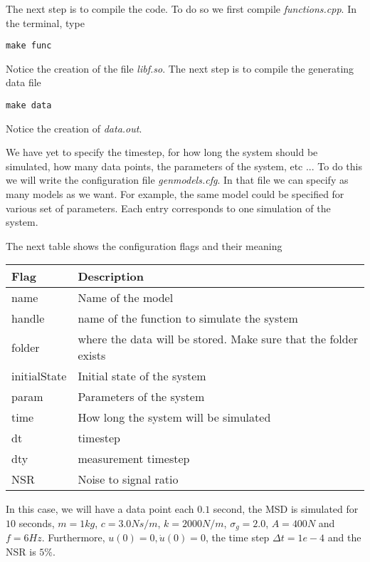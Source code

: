 \documentclass{article}
\begin{document}
% 

The next step is to compile the code. To do so we first compile {\em functions.cpp}. In the terminal, type
\begin{lstlisting}
make func
\end{lstlisting}
Notice the creation of the file {\em libf.so}. The next step is to compile the generating data file
\begin{lstlisting}
make data
\end{lstlisting}
Notice the creation of {\em data.out}.

We have yet to specify the timestep, for how long the system should be simulated, how many data points, the parameters of the system, etc ... To do this we will write the configuration file {\em genmodels.cfg}. In that file we can specify as many models as we want. For example, the same model could be specified for various set of parameters. Each entry corresponds to one simulation of the system.

% 

The next table shows the configuration flags and their meaning
\begin{table}[h]
\begin{tabular}{| l | l |}
\hline 
Flag & Description \\
\hline 
name & Name of the model \\
handle & name of the function to simulate the system \\
folder & where the data will be stored. Make sure that the folder exists \\
initialState & Initial state of the system \\
param & Parameters of the system \\
time & How long the system will be simulated \\
dt & timestep \\
dty & measurement timestep \\
NSR & Noise to signal ratio \\
\hline
\end{tabular}
\end{table}

In this case, we will have a data point each $0.1$ second, the MSD is simulated for $10$ seconds, $m = 1kg$, $c = 3.0 N s /m$, $k = 2000 N/m$, $\sigma_g = 2.0$, $A = 400 N$ and $f  = 6 Hz$. Furthermore, $u(0) = 0, \dot{u}(0) = 0$, the time step $\Delta t =  1e-4$ and the NSR is $5\%$.
\end{document}
